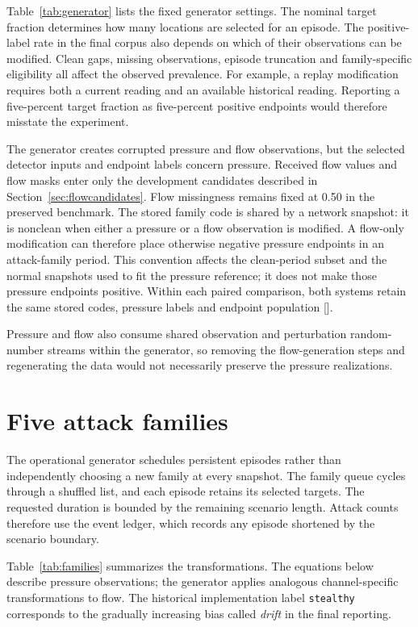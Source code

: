 Table~\ref{tab:generator} lists the fixed generator settings. The nominal target fraction determines how many locations are selected for an episode. The positive-label rate in the final corpus also depends on which of their observations can be modified. Clean gaps, missing observations, episode truncation and family-specific eligibility all affect the observed prevalence. For example, a replay modification requires both a current reading and an available historical reading. Reporting a five-percent target fraction as five-percent positive endpoints would therefore misstate the experiment.

The generator creates corrupted pressure and flow observations, but the selected detector inputs and endpoint labels concern pressure. Received flow values and flow masks enter only the development candidates described in Section~\ref{sec:flowcandidates}. Flow missingness remains fixed at 0.50 in the preserved benchmark. The stored family code is shared by a network snapshot: it is nonclean when either a pressure or a flow observation is modified. A flow-only modification can therefore place otherwise negative pressure endpoints in an attack-family period. This convention affects the clean-period subset and the normal snapshots used to fit the pressure reference; it does not make those pressure endpoints positive. Within each paired comparison, both systems retain the same stored codes, pressure labels and endpoint population [].

Pressure and flow also consume shared observation and perturbation random-number streams within the generator, so removing the flow-generation steps and regenerating the data would not necessarily preserve the pressure realizations.

\section{Five attack families}
The operational generator schedules persistent episodes rather than independently choosing a new family at every snapshot. The family queue cycles through a shuffled list, and each episode retains its selected targets. The requested duration is bounded by the remaining scenario length. Attack counts therefore use the event ledger, which records any episode shortened by the scenario boundary.

Table~\ref{tab:families} summarizes the transformations. The equations below describe pressure observations; the generator applies analogous channel-specific transformations to flow. The historical implementation label \texttt{stealthy} corresponds to the gradually increasing bias called \emph{drift} in the final reporting.

